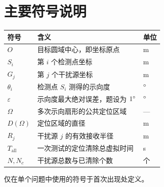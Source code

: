 \section{主要符号说明}

\begin{center}
\begin{tabular}{>{\centering\arraybackslash}p{}p{}>{\centering\arraybackslash}p{}}
\toprule
符号 & 含义 & 单位 \\
\midrule
\(O\) & 目标圆域中心，即坐标原点 & m \\
\(S_i\) & 第 \(i\) 个检测点坐标 & m \\
\(G_j\) & 第 \(j\) 个干扰源坐标 & m \\
\(\theta_i\) & 检测点 \(S_i\) 测得的示向度 & \(^{\circ}\) \\
\(\varepsilon\) & 示向度最大绝对误差，题设为 \(1^{\circ}\) & \(^{\circ}\) \\
\(\Omega\) & 多次示向扇形的公共定位区域 & --- \\
\(D(\Omega)\) & 定位区域的直径 & m \\
\(R_j\) & 干扰源 \(j\) 的有效接收半径 & m \\
\(T_{\mathrm{all}}\) & 一次测试的定位清除总虚拟时间 & s \\
\(N, N_c\) & 干扰源总数与已清除个数 & 个 \\
\bottomrule
\end{tabular}
\end{center}

仅在单个问题中使用的符号于首次出现处定义。
